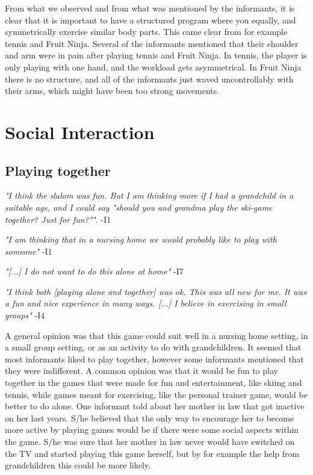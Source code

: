 From what we observed and from what was mentioned by the informants, it is clear that it is important to have a structured program where you equally, and symmetrically exercise similar body parts. This came clear from for example tennis and Fruit Ninja. Several of the informants mentioned that their shoulder and arm were in pain after playing tennis and Fruit Ninja. In tennis, the player is only playing with one hand, and the workload gets asymmetrical. In Fruit Ninja there is no structure, and all of the informants just waved uncontrollably with their arms, which might have been too strong movements.
    
\section{Social Interaction}
\subsection{Playing together}
\emph{"I think the slalom was fun. But I am thinking more if I had a grandchild in a suitable age, and I could say "should you and grandma play the ski-game together? Just for fun?""}. -I1

\emph{"I am thinking that in a nursing home we would probably like to play with someone"} -I1

\emph{"[...] I do not want to do this alone at home"} -I7

\emph{"I think both [playing alone and together] was ok. This was all new for me. It was a fun and nice experience in many ways. [...] I believe in  exercising in small groups"} -I4

A general opinion was that this game could suit well in a nursing home setting, in a small group setting, or as an activity to do with grandchildren. It seemed that most informants liked to play together, however some informants mentioned that they were indifferent. A common opinion was that it would be fun to play together in the games that were made for fun and entertainment, like skiing and tennis, while games meant for exercising, like the personal trainer game, would be better to do alone. One informant told about her mother in law that got inactive on her last years. S/he believed that the only way to encourage her to become more active by playing games would be if there were some social aspects within the game. S/he was sure that her mother in law never would have switched on the TV and started playing this game herself, but by for example the help from grandchildren this could be more likely.

